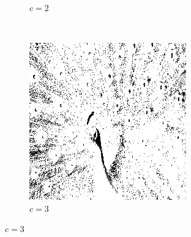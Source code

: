 \documentclass{article}
\begin{document}
\begin{enumerate}[label=(\alph*)]
\begin{figure}[!htb]
\begin{subfigure}[b]{0.3\textwidth}
            \caption{$c = 2$}
        \end{subfigure}
        ~
        \begin{subfigure}[b]{0.3\textwidth}
            \includegraphics[width=\textwidth]{img/ILT3.png}
            \caption{$c = 3$}
        \end{subfigure}
        
        

\end{figure}
\end{enumerate}
\end{document}
